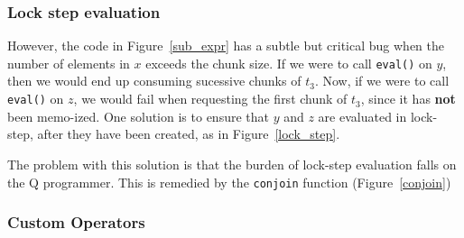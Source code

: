 \begin{figure}
\centering
{}
\end{figure}


\subsubsection{Lock step evaluation}
However, the code in Figure~\ref{sub_expr} has a subtle but
critical bug when the number of elements in \(x\) exceeds the chunk
size.  If we were to call {\tt eval()} on \(y\), then we would
end up consuming sucessive chunks of \(t_3\). Now, if we were to call
{\tt eval()} on \(z\), we would fail when requesting the first
chunk of \(t_3\), since it has {\bf not} been memo-ized. One solution
is to ensure that \(y\) and \(z\) are evaluated in lock-step, after they have
been created, as in Figure~\ref{lock_step}.
\begin{figure}
\centering
{}
\end{figure}

The problem with this solution is that the burden of lock-step evaluation falls
on the Q programmer. This is remedied by the {\tt conjoin} function
(Figure~\ref{conjoin})

\begin{figure}
\centering
{}
\end{figure}


\subsubsection{Custom Operators}

